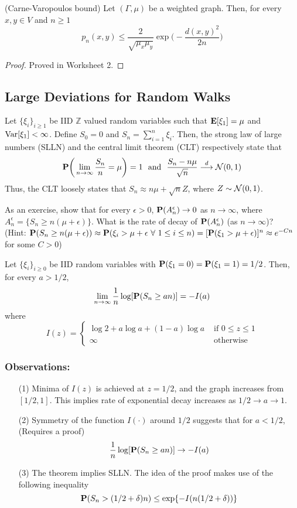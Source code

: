 \documentclass[main]{subfiles}
\begin{document}
\begin{theorem}
	(Carne-Varopoulos bound) Let $(\Gamma, \mu)$ be a weighted graph. Then, for every $x,y\in V$ and $n\ge 1$
	\[p_n(x,y)\le \frac{2}{\sqrt{\mu_x\mu_y}}\exp\bigg(-\frac{d(x,y)^2}{2n}\bigg)\]
\end{theorem}
\begin{proof}
	Proved in Worksheet 2.
\end{proof}

\subsection*{Large Deviations for Random Walks}
Let $\{\xi_i\}_{i\ge 1}$ be IID $\mathbb{Z}$ valued random variables such that $\E[\xi_1]=\mu$ and $\Var[\xi_1]<\infty$. Define $S_0=0$ and $S_n=\sum_{i=1}^n\xi_i$. Then, the strong law of large numbers (SLLN) and the central limit theorem (CLT) respectively state that
\[\P\bigg(\lim_{n\to\infty}\frac{S_n}{n}=\mu\bigg)=1\text{\ \ and\ \ }\frac{S_n-n\mu}{\sqrt{n}}\overset{d}{\longrightarrow}\SN(0,1)\]
Thus, the CLT loosely states that $S_n \approx n\mu + \sqrt{n}Z$, where $Z\sim\SN(0,1)$.

As an exercise, show that for every $\epsilon > 0$, $\P(A_n^{\epsilon})\to 0$ as $n\to\infty$, where $A_n^{\epsilon}=\{S_n\ge n(\mu + \epsilon)\}$. What is the rate of decay of $\P(A_n^{\epsilon})$ (as $n\to\infty$)?\\
(Hint: $\P(S_n\ge n(\mu + \epsilon))\approx\P(\xi_i > \mu + \epsilon\text{ $\forall$ }1\le i\le n)=[\P(\xi_1 > \mu + \epsilon)]^n\approx e^{-Cn}$ for some $C>0$)

\begin{theorem}
	Let $\{\xi_i\}_{i\ge 0}$ be IID random variables with    $\P(\xi_1=0)=\P(\xi_1=1)=1/2$. Then, for every $a>1/2$,
	\[\lim_{n\to\infty}\frac{1}{n}\log[\P(S_n\ge an)]=-I(a)\]
	where
	\[I(z)=
	\begin{cases}
		\log 2 + a\log a + (1-a)\log a & \text{ if } 0\le z\le 1\\
		\infty & \text{ otherwise}
	\end{cases}
	\]
\end{theorem}

\subsubsection*{Observations:}
\begin{itemize}
	\item[(1)] Minima of $I(z)$ is achieved at $z=1/2$, and the graph increases from $[1/2, 1]$. This implies rate of exponential decay increases as $1/2\to a\to 1$.
	\item[(2)] Symmetry of the function $I(\cdot)$ around $1/2$ suggests that for $a<1/2$, (Requires a proof)
	\[\frac{1}{n}\log[\P(S_n\ge an)]\to -I(a)\]
	\item[(3)] The theorem implies SLLN. The idea of the proof makes use of the following inequality
	\[\P(S_n>(1/2 + \delta)n)\le\exp\{-I(n(1/2+\delta))\}\]
\end{itemize}
\end{document}
